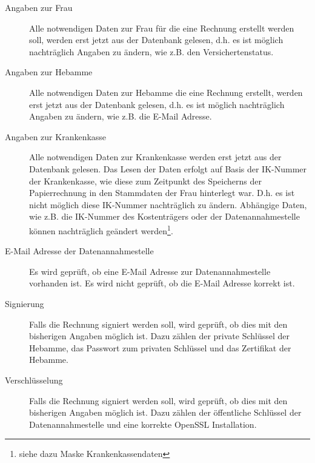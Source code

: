 \begin{description}
\item[Angaben zur Frau]
Alle notwendigen Daten zur Frau für die eine Rechnung erstellt werden soll,
werden erst jetzt aus der Datenbank gelesen, d.h. es ist möglich
nachträglich Angaben zu ändern, wie z.B. den Versichertenstatus.
\item[Angaben zur Hebamme]
Alle notwendigen Daten zur Hebamme die eine Rechnung erstellt,
werden erst jetzt aus der Datenbank gelesen, d.h. es ist möglich
nachträglich Angaben zu ändern, wie z.B. die E-Mail Adresse.
\item[Angaben zur Krankenkasse]
Alle notwendigen Daten zur Krankenkasse werden erst jetzt aus der Datenbank 
gelesen. Das Lesen der Daten erfolgt auf Basis der IK-Nummer der Krankenkasse,
wie diese zum Zeitpunkt des Speicherns der Papierrechnung in den Stammdaten
der Frau hinterlegt war. D.h. es ist nicht möglich diese IK-Nummer
nachträglich zu ändern.
Abhängige Daten, wie z.B. die IK-Nummer des Kostenträgers oder der
Datenannahmestelle können nachträglich geändert werden\footnote{siehe
dazu Maske Krankenkassendaten}. 
\item[E-Mail Adresse der Datenannahmestelle]
Es wird geprüft, ob eine E-Mail Adresse zur Datenannahmestelle vorhanden ist.
Es wird nicht geprüft, ob die E-Mail Adresse korrekt ist.
\item[Signierung]
Falls die Rechnung signiert werden soll, wird geprüft, ob dies mit den
bisherigen Angaben möglich ist. Dazu zählen der private Schlüssel der
Hebamme, das Passwort zum privaten Schlüssel und  das Zertifikat der Hebamme.
\item[Verschlüsselung]
Falls die Rechnung signiert werden soll, wird geprüft, ob dies mit den
bisherigen Angaben möglich ist. Dazu zählen der öffentliche Schlüssel
der Datenannahmestelle und eine korrekte OpenSSL Installation.
\end{description}

